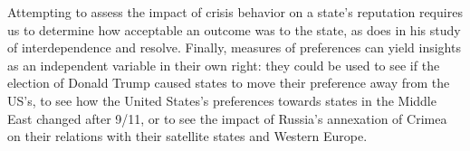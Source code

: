 Attempting to assess the impact of crisis behavior on a state's reputation requires us to determine how acceptable an outcome was to the state, as \citep{crescenzi:200X} does in his study of interdependence and resolve. Finally, measures of preferences can yield insights as an independent variable in their own right: they could be used to see if the election of Donald Trump caused states to move their preference away from the US's, to see how the United States's preferences towards states in the Middle East changed after 9/11, or to see the impact of Russia's annexation of Crimea on their relations with their satellite states and Western Europe.